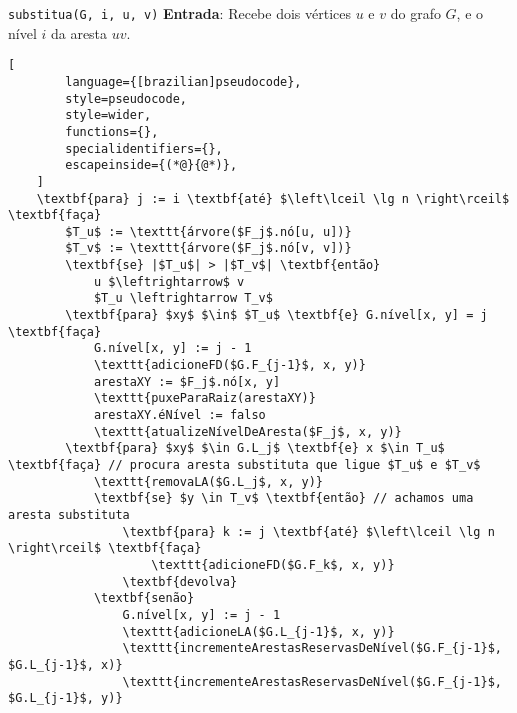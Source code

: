 \begin{programruledcaption}{\texttt{substitua(G, i, u, v)} \label{prog:replaceGD}}
    \noindent\textbf{Entrada}: Recebe dois vértices $u$ e $v$ do grafo $G$, e o nível $i$ da aresta $uv$.
    \vspace{-0.5\baselineskip}
    \begin{lstlisting}[
        language={[brazilian]pseudocode},
        style=pseudocode,
        style=wider,
        functions={},
        specialidentifiers={},
        escapeinside={(*@}{@*)},
    ]
    \textbf{para} j := i \textbf{até} $\left\lceil \lg n \right\rceil$ \textbf{faça}
        $T_u$ := \texttt{árvore($F_j$.nó[u, u])}
        $T_v$ := \texttt{árvore($F_j$.nó[v, v])}    
        \textbf{se} |$T_u$| > |$T_v$| \textbf{então}
            u $\leftrightarrow$ v
            $T_u \leftrightarrow T_v$
        \textbf{para} $xy$ $\in$ $T_u$ \textbf{e} G.nível[x, y] = j \textbf{faça}
            G.nível[x, y] := j - 1
            \texttt{adicioneFD($G.F_{j-1}$, x, y)}
            arestaXY := $F_j$.nó[x, y]
            \texttt{puxeParaRaiz(arestaXY)}
            arestaXY.éNível := falso
            \texttt{atualizeNívelDeAresta($F_j$, x, y)}
        \textbf{para} $xy$ $\in G.L_j$ \textbf{e} x $\in T_u$ \textbf{faça} // procura aresta substituta que ligue $T_u$ e $T_v$
            \texttt{removaLA($G.L_j$, x, y)} 
            \textbf{se} $y \in T_v$ \textbf{então} // achamos uma aresta substituta
                \textbf{para} k := j \textbf{até} $\left\lceil \lg n \right\rceil$ \textbf{faça}
                    \texttt{adicioneFD($G.F_k$, x, y)}
                \textbf{devolva}
            \textbf{senão}
                G.nível[x, y] := j - 1
                \texttt{adicioneLA($G.L_{j-1}$, x, y)}
                \texttt{incrementeArestasReservasDeNível($G.F_{j-1}$, $G.L_{j-1}$, x)}
                \texttt{incrementeArestasReservasDeNível($G.F_{j-1}$, $G.L_{j-1}$, y)}

    \end{lstlisting}
    \vspace{-0.5\baselineskip}
\end{programruledcaption}

